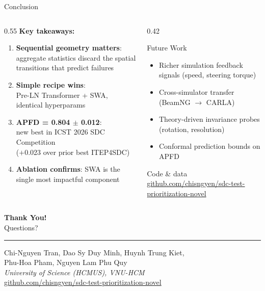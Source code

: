 \documentclass[aspectratio=169,10pt]{beamer}
\begin{document}
\begin{frame}{Conclusion}
  \begin{columns}[T]
    \begin{column}{0.55\linewidth}
      \textbf{Key takeaways:}
      \begin{enumerate}
        \item \textbf{Sequential geometry matters}:\\
              aggregate statistics discard the spatial transitions that predict failures
        \item \textbf{Simple recipe wins}:\\
              Pre-LN Transformer + SWA, identical hyperparams
        \item \textbf{APFD = 0.804 $\pm$ 0.012}:\\
              new best in ICST 2026 SDC Competition\\
              ($+$0.023 over prior best ITEP4SDC)
        \item \textbf{Ablation confirms}: SWA is the single most impactful component
      \end{enumerate}
    \end{column}
    \begin{column}{0.42\linewidth}
      \begin{block}{Future Work}
        \begin{itemize}
          \item Richer simulation feedback signals (speed, steering torque)
          \item Cross-simulator transfer (BeamNG $\to$ CARLA)
          \item Theory-driven invariance probes (rotation, resolution)
          \item Conformal prediction bounds on APFD
        \end{itemize}
      \end{block}
      \vspace{6pt}
      \begin{alertblock}{Code \& data}
        \url{github.com/chisngyen/sdc-test-prioritization-novel}
      \end{alertblock}
    \end{column}
  \end{columns}
\end{frame}

\begin{frame}[plain]
  \begin{center}
    \vspace{1.5cm}
    {\Large \textbf{Thank You!}}\\[12pt]
    {\large Questions?}\\[20pt]
    \hrule
    \vspace{10pt}
    {\small
    Chi-Nguyen Tran, Dao Sy Duy Minh, Huynh Trung Kiet,\\
    Phu-Hoa Pham, Nguyen Lam Phu Quy\\[4pt]
    \textit{University of Science (HCMUS), VNU-HCM}\\[6pt]
    \url{github.com/chisngyen/sdc-test-prioritization-novel}
    }
  \end{center}
\end{frame}
\end{document}
